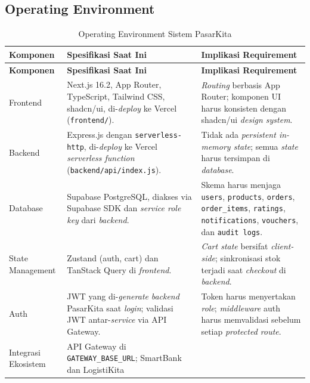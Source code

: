 \subsection{Operating Environment}

\begin{longtable}{|L{2.8cm}|L{5.5cm}|L{6.2cm}|}
    \caption{Operating Environment Sistem PasarKita}
    \label{tab:operating-env} \\
    \hline
    \textbf{Komponen} & \textbf{Spesifikasi Saat Ini} & \textbf{Implikasi Requirement} \\
    \hline
    \endfirsthead
    \hline
    \textbf{Komponen} & \textbf{Spesifikasi Saat Ini} & \textbf{Implikasi Requirement} \\
    \hline
    \endhead
    \hline
    \endfoot
    Frontend
        & Next.js 16.2, App Router, TypeScript, Tailwind CSS, shadcn/ui,
          di-\textit{deploy} ke Vercel (\texttt{frontend/}).
        & \textit{Routing} berbasis App Router; komponen UI harus konsisten dengan
          shadcn/ui \textit{design system}. \\
    \hline
    Backend
        & Express.js dengan \texttt{serverless-http}, di-\textit{deploy} ke Vercel
          \textit{serverless function} (\texttt{backend/api/index.js}).
        & Tidak ada \textit{persistent in-memory state}; semua \textit{state} harus
          tersimpan di \textit{database}. \\
    \hline
    Database
        & Supabase PostgreSQL, diakses via Supabase SDK dan \textit{service role key}
          dari \textit{backend}.
        & Skema harus menjaga \texttt{users}, \texttt{products}, \texttt{orders},
          \texttt{order\_items}, \texttt{ratings}, \texttt{notifications},
          \texttt{vouchers}, dan \texttt{audit logs}. \\
    \hline
    State Management
        & Zustand (auth, cart) dan TanStack Query di \textit{frontend}.
        & \textit{Cart state} bersifat \textit{client-side}; sinkronisasi stok
          terjadi saat \textit{checkout} di \textit{backend}. \\
    \hline
    Auth
        & JWT yang di-\textit{generate} \textit{backend} PasarKita saat \textit{login};
          validasi JWT antar-\textit{service} via API Gateway.
        & Token harus menyertakan \textit{role}; \textit{middleware} auth harus
          memvalidasi sebelum setiap \textit{protected route}. \\
    \hline
    Integrasi Ekosistem
        & API Gateway di \texttt{GATEWAY\_BASE\_URL}; SmartBank dan LogistiKita

\end{longtable}
